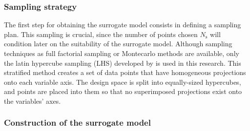 \documentclass[12pt,number,preprint,review,times]{elsarticle}
\begin{document}
\subsubsection{Sampling strategy}

The first step for obtaining the surrogate model consists in defining a sampling plan. This sampling is crucial, since the number of points chosen $N_{\mathrm{s}}$ will condition later on the suitability of the surrogate model. Although sampling techniques as full factorial sampling or Montecarlo methods are available, only the latin hypercube sampling (LHS) developed by \citet{mckay} is used in this research. This stratified method creates a set of data points that have homogeneous projections onto each variable axis. The design space is split into equally-sized hypercubes, and points are placed into them so that no superimposed projections exist onto the variables' axes. %



\subsubsection{Construction of the surrogate model}
 
\end{document}
